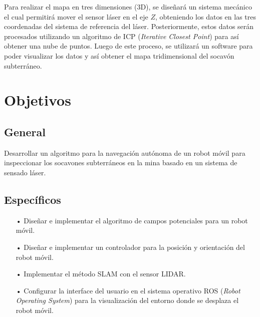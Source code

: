 Para realizar el mapa en tres dimensiones (3D), se diseñará un sistema mecánico el cual permitirá mover el sensor láser en el eje $Z$, obteniendo los datos en las tres coordenadas del sistema de referencia del láser. Posteriormente, estos datos serán procesados utilizando un algoritmo de ICP (\textit{Iterative Closest Point}) para así obtener una nube de puntos. Luego de este proceso, se utilizará un software para poder visualizar los datos y así obtener el mapa tridimensional del socavón subterráneo.
 
\section{Objetivos}

\subsection{General}
Desarrollar un algoritmo para la navegación autónoma de un robot móvil para inspeccionar los socavones subterráneos en la mina basado en un sistema de sensado láser. 
\\
\subsection{Específicos}
\begin{itemize}
\item[•]Diseñar e implementar el algoritmo de campos potenciales para un robot móvil.
\item[•]Diseñar e implementar un controlador para la posición y orientación del robot móvil.
\item[•]Implementar el método SLAM con el sensor LIDAR.
\item[•]Configurar la interface del usuario en el sistema operativo ROS (\textit{Robot Operating System}) para la visualización del entorno donde se desplaza el robot móvil.
\end{itemize}


